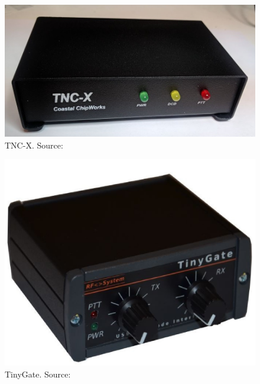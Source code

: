 \begin{minipage}{\linewidth}
    \centering
    \begin{minipage}{0.45\linewidth}
        \begin{figure}[H]
            \centering
            \includegraphics[width=0.3\paperwidth]{img/4/tncx.jpg}
            \caption{TNC-X. Source: \cite{tncx}}
            \label{tncx}
        \end{figure}
    \end{minipage}
    \hspace{0.05\linewidth}
    \begin{minipage}{0.45\linewidth}
        \begin{figure}[H]
            \centering
            \includegraphics[width=0.3\paperwidth]{img/4/tinygate_view.jpg}
            \caption{TinyGate. Source: \cite{tinygate_manual}}
            \label{tnc:tinygate}
        \end{figure}
    \end{minipage}
\end{minipage}

